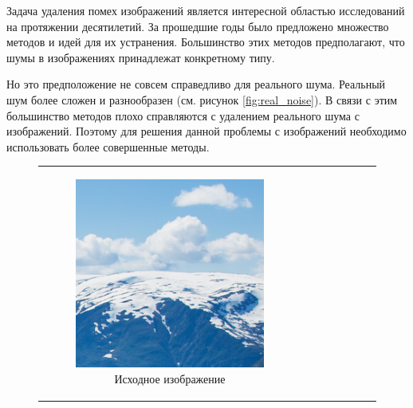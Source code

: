 Задача удаления помех изображений является интересной областью исследований на протяжении десятилетий. За прошедшие годы было предложено множество методов и идей для их устранения. Большинство этих методов предполагают, что шумы в изображениях принадлежат конкретному типу.

Но это предположение не совсем справедливо для реального шума. Реальный шум более сложен и разнообразен (см. рисунок \ref{fig:real_noise}). В связи с этим большинство методов плохо справляются с удалением реального шума с изображений. Поэтому для решения данной проблемы с изображений необходимо использовать более совершенные методы.

\begin{figure}[h!]
  \centering
  \begin{tabular}{cc}
    \begin{subfigure}{0.45\textwidth}
      \includegraphics[width=\linewidth]{inc/analysis/noises/original.png}
      \caption{Исходное изображение}
    \end{subfigure} &
    \begin{subfigure}{0.45\textwidth}

\end{subfigure}
\end{tabular}
\end{figure}
